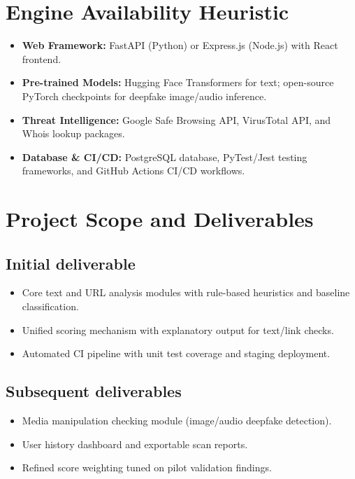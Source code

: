 \documentclass[11pt,a4paper]{article}
\newcommand{\BvrHint}[1]{%
  {\normalfont\normalsize\itshape\hfill #1}}
\begin{document}
\section{Engine Availability Heuristic}
\begin{itemize}[leftmargin=0.7cm]
    \item \textbf{Web Framework:} FastAPI (Python) or Express.js (Node.js) with React frontend.
    \item \textbf{Pre-trained Models:} Hugging Face Transformers for text; open-source PyTorch checkpoints for deepfake image/audio inference.
    \item \textbf{Threat Intelligence:} Google Safe Browsing API, VirusTotal API, and Whois lookup packages.
    \item \textbf{Database \& CI/CD:} PostgreSQL database, PyTest/Jest testing frameworks, and GitHub Actions CI/CD workflows.
\end{itemize}

\section{Project Scope and Deliverables %
\BvrHint{}}
\subsection{Initial deliverable %
\BvrHint{}}
\begin{itemize}[leftmargin=0.7cm]
    \item Core text and URL analysis modules with rule-based heuristics and baseline classification.
    \item Unified scoring mechanism with explanatory output for text/link checks.
    \item Automated CI pipeline with unit test coverage and staging deployment.
\end{itemize}

\subsection{Subsequent deliverables}
\begin{itemize}[leftmargin=0.7cm]
    \item Media manipulation checking module (image/audio deepfake detection).
    \item User history dashboard and exportable scan reports.
    \item Refined score weighting tuned on pilot validation findings.
\end{itemize}
\end{document}
